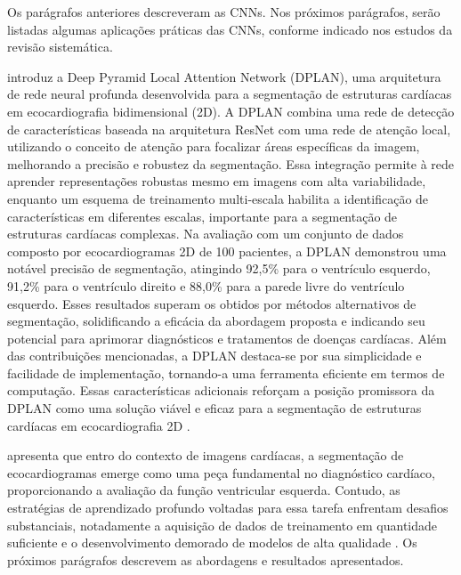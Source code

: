 Os parágrafos anteriores descreveram as CNNs. Nos próximos parágrafos, serão listadas algumas aplicações práticas das CNNs, conforme indicado nos estudos da revisão sistemática.

\textcite{LIU2021101873} introduz a Deep Pyramid Local Attention Network (DPLAN), uma arquitetura de rede neural profunda desenvolvida para a segmentação de estruturas cardíacas em ecocardiografia bidimensional (2D). A DPLAN combina uma rede de detecção de características baseada na arquitetura ResNet com uma rede de atenção local, utilizando o conceito de atenção para focalizar áreas específicas da imagem, melhorando a precisão e robustez da segmentação. Essa integração permite à rede aprender representações robustas mesmo em imagens com alta variabilidade, enquanto um esquema de treinamento multi-escala habilita a identificação de características em diferentes escalas, importante para a segmentação de estruturas cardíacas complexas. Na avaliação com um conjunto de dados composto por ecocardiogramas 2D de 100 pacientes, a DPLAN demonstrou uma notável precisão de segmentação, atingindo 92,5\% para o ventrículo esquerdo, 91,2\% para o ventrículo direito e 88,0\% para a parede livre do ventrículo esquerdo. Esses resultados superam os obtidos por métodos alternativos de segmentação, solidificando a eficácia  da abordagem proposta e indicando seu potencial para aprimorar diagnósticos e tratamentos de doenças cardíacas. Além das contribuições mencionadas, a DPLAN destaca-se por sua simplicidade e facilidade de implementação, tornando-a uma ferramenta eficiente em termos de computação. Essas características adicionais reforçam a posição promissora da DPLAN como uma solução viável e eficaz para a segmentação de estruturas cardíacas em ecocardiografia 2D .


\textcite{9648607} apresenta que entro do contexto de imagens cardíacas, a segmentação de ecocardiogramas emerge como uma peça fundamental no diagnóstico cardíaco, proporcionando a avaliação  da função ventricular esquerda. Contudo, as estratégias de aprendizado profundo voltadas para essa tarefa enfrentam desafios substanciais, notadamente a aquisição de dados de treinamento em quantidade suficiente e o desenvolvimento demorado de modelos de alta qualidade . Os próximos parágrafos descrevem  as abordagens e resultados apresentados.

